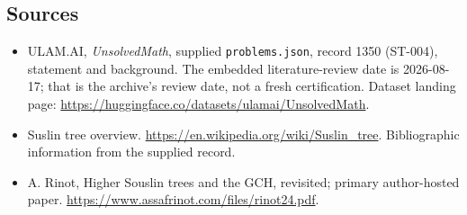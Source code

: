 \documentclass[11pt,a4paper]{article}
\begin{document}
\subsection{Sources}

{\small

\begin{itemize}

\item[\hypertarget{source:1350:1}{S1}] ULAM.AI, \emph{UnsolvedMath}, supplied \texttt{problems.json}, record 1350 (ST-004), statement and background. The embedded literature-review date is 2026-08-17; that is the archive’s review date, not a fresh certification. Dataset landing page: \url{https://huggingface.co/datasets/ulamai/UnsolvedMath}.

\item[\hypertarget{source:1350:2}{S2}] Suslin tree overview. \url{https://en.wikipedia.org/wiki/Suslin_tree}. Bibliographic information from the supplied record.

\item[R1] A. Rinot, Higher Souslin trees and the GCH, revisited; primary author-hosted paper.
\url{https://www.assafrinot.com/files/rinot24.pdf}.
\end{itemize}

}

\label{end:1350}
\end{document}
